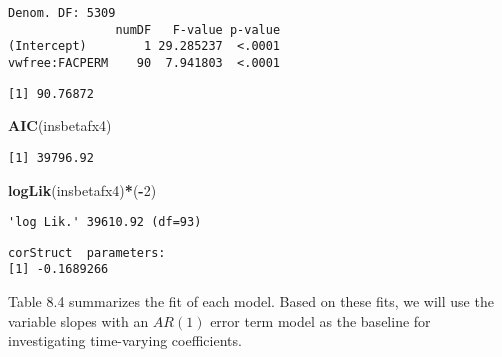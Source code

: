 \documentclass[]{book}
\newenvironment{Shaded}{\begin{snugshade}}{\end{snugshade}}
\newcommand{\DecValTok}[1]{\textcolor[rgb]{0.00,0.00,0.81}{#1}}
\newcommand{\KeywordTok}[1]{\textcolor[rgb]{0.13,0.29,0.53}{\textbf{#1}}}
\newcommand{\NormalTok}[1]{#1}
\newcommand{\OperatorTok}[1]{\textcolor[rgb]{0.81,0.36,0.00}{\textbf{#1}}}
\begin{document}
\begin{verbatim}
Denom. DF: 5309 
               numDF   F-value p-value
(Intercept)        1 29.285237  <.0001
vwfree:FACPERM    90  7.941803  <.0001
\end{verbatim}

\begin{Shaded}
\end{Shaded}

\begin{verbatim}
[1] 90.76872
\end{verbatim}

\begin{Shaded}
\begin{Highlighting}[]
\KeywordTok{AIC}\NormalTok{(insbetafx4)}
\end{Highlighting}
\end{Shaded}

\begin{verbatim}
[1] 39796.92
\end{verbatim}

\begin{Shaded}
\begin{Highlighting}[]
\KeywordTok{logLik}\NormalTok{(insbetafx4)}\OperatorTok{*}\NormalTok{(}\OperatorTok{-}\DecValTok{2}\NormalTok{)}
\end{Highlighting}
\end{Shaded}

\begin{verbatim}
'log Lik.' 39610.92 (df=93)
\end{verbatim}

\begin{Shaded}
\end{Shaded}

\begin{verbatim}
corStruct  parameters:
[1] -0.1689266
\end{verbatim}

Table 8.4 summarizes the fit of each model. Based on these fits, we will use the variable slopes with an \(AR(1)\) error term model as the baseline for investigating time-varying coefficients.
\end{document}
